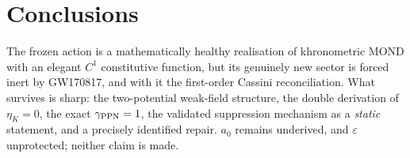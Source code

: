 \documentclass[11pt]{article}
\begin{document}
\section{Conclusions}
The frozen action is a mathematically healthy realisation of khronometric MOND with an
elegant $C^1$ constitutive function, but its genuinely new sector is forced inert by
GW170817, and with it the first-order Cassini reconciliation.  What survives is sharp:
the two-potential weak-field structure, the double derivation of $\eta_K=0$, the exact
$\gamma_{\rm PPN}=1$, the validated suppression mechanism as a \emph{static} statement,
and a precisely identified repair.  $a_0$ remains underived, and $\varepsilon$
unprotected; neither claim is made.
\end{document}
